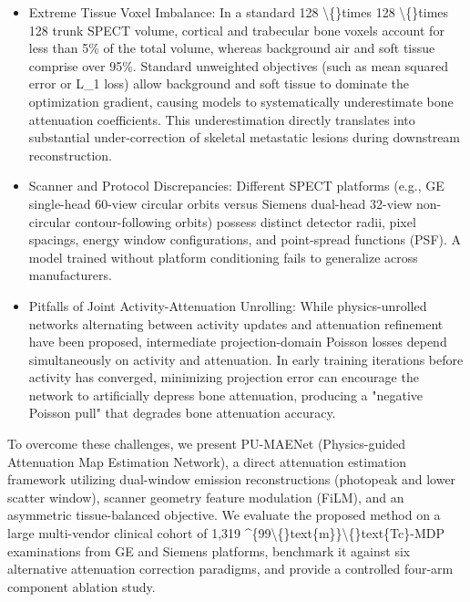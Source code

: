 \documentclass[11pt]{article}
\begin{document}
\begin{itemize}\item  Extreme Tissue Voxel Imbalance: In a standard 128 \textbackslash\{\}times 128 \textbackslash\{\}times 128 trunk SPECT volume, cortical and trabecular bone voxels account for less than 5\% of the total volume, whereas background air and soft tissue comprise over 95\%. Standard unweighted objectives (such as mean squared error or L\_1 loss) allow background and soft tissue to dominate the optimization gradient, causing models to systematically underestimate bone attenuation coefficients. This underestimation directly translates into substantial under-correction of skeletal metastatic lesions during downstream reconstruction.\end{itemize}
\begin{itemize}\item  Scanner and Protocol Discrepancies: Different SPECT platforms (e.g., GE single-head 60-view circular orbits versus Siemens dual-head 32-view non-circular contour-following orbits) possess distinct detector radii, pixel spacings, energy window configurations, and point-spread functions (PSF). A model trained without platform conditioning fails to generalize across manufacturers.\end{itemize}
\begin{itemize}\item  Pitfalls of Joint Activity-Attenuation Unrolling: While physics-unrolled networks alternating between activity updates and attenuation refinement have been proposed, intermediate projection-domain Poisson losses depend simultaneously on activity and attenuation. In early training iterations before activity has converged, minimizing projection error can encourage the network to artificially depress bone attenuation, producing a "negative Poisson pull" that degrades bone attenuation accuracy.\end{itemize}
To overcome these challenges, we present PU-MAENet (Physics-guided Attenuation Map Estimation Network), a direct attenuation estimation framework utilizing dual-window emission reconstructions (photopeak and lower scatter window), scanner geometry feature modulation (FiLM), and an asymmetric tissue-balanced objective. We evaluate the proposed method on a large multi-vendor clinical cohort of 1,319 \textasciicircum{}\{99\textbackslash\{\}text\{m\}\}\textbackslash\{\}text\{Tc\}-MDP examinations from GE and Siemens platforms, benchmark it against six alternative attenuation correction paradigms, and provide a controlled four-arm component ablation study.\par
\end{document}
